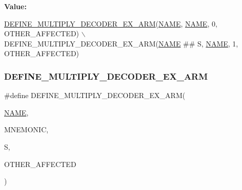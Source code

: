 {\bfseries Value\+:}
\begin{DoxyCode}
\mbox{\hyperlink{decoder-arm_8c_afc2ae0e71cbb57e26b7bc46758f2d130}{DEFINE\_MULTIPLY\_DECODER\_EX\_ARM}}(\mbox{\hyperlink{inflate_8h_a164ea0159d5f0b5f12a646f25f99eceaa67bc2ced260a8e43805d2480a785d312}{NAME}}, \mbox{\hyperlink{inflate_8h_a164ea0159d5f0b5f12a646f25f99eceaa67bc2ced260a8e43805d2480a785d312}{NAME}}, 0, OTHER\_AFFECTED) \(\backslash\)
    DEFINE\_MULTIPLY\_DECODER\_EX\_ARM(\mbox{\hyperlink{inflate_8h_a164ea0159d5f0b5f12a646f25f99eceaa67bc2ced260a8e43805d2480a785d312}{NAME}} ## S, \mbox{\hyperlink{inflate_8h_a164ea0159d5f0b5f12a646f25f99eceaa67bc2ced260a8e43805d2480a785d312}{NAME}}, 1, OTHER\_AFFECTED)
\end{DoxyCode}
\mbox{\label{decoder-arm_8c_afc2ae0e71cbb57e26b7bc46758f2d130}} 
\subsubsection{\texorpdfstring{D\+E\+F\+I\+N\+E\+\_\+\+M\+U\+L\+T\+I\+P\+L\+Y\+\_\+\+D\+E\+C\+O\+D\+E\+R\+\_\+\+E\+X\+\_\+\+A\+RM}{DEFINE\_MULTIPLY\_DECODER\_EX\_ARM}}
{\footnotesize\ttfamily \#define D\+E\+F\+I\+N\+E\+\_\+\+M\+U\+L\+T\+I\+P\+L\+Y\+\_\+\+D\+E\+C\+O\+D\+E\+R\+\_\+\+E\+X\+\_\+\+A\+RM(\begin{DoxyParamCaption}\item[{}]{\mbox{\hyperlink{inflate_8h_a164ea0159d5f0b5f12a646f25f99eceaa67bc2ced260a8e43805d2480a785d312}{N\+A\+ME}},  }\item[{}]{M\+N\+E\+M\+O\+N\+IC,  }\item[{}]{S,  }\item[{}]{O\+T\+H\+E\+R\+\_\+\+A\+F\+F\+E\+C\+T\+ED }\end{DoxyParamCaption})}


